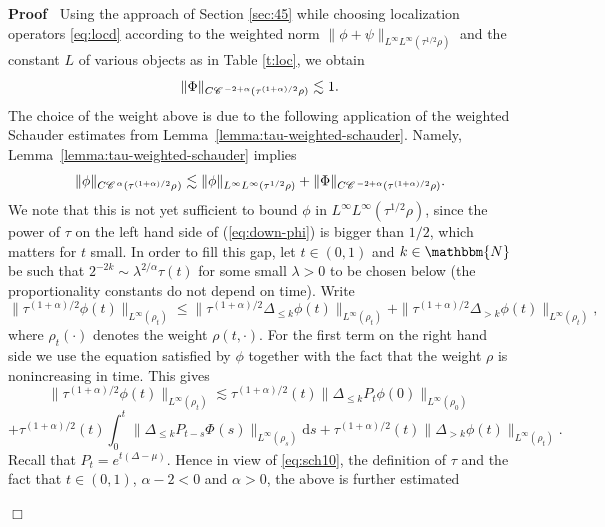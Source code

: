 \documentclass[a4paper,11pt]{article}
\newcommand{\mathd}{\mathrm{d}}
\newenvironment{proof}{\noindent\textbf{Proof\ }}{\hspace*{\fill}$\Box$\medskip}
\numberwithin{equation}{section}
\newcommand{\CC}{\mathscr{C} \hspace{.1em}}
\newcommand{\8}{\infty}
\begin{document}
\begin{proof}
  Using the approach of Section \ref{sec:45} while choosing localization
  operators \eqref{eq:locd} according to the weighted norm $\| \phi + \psi \|_{L^{\infty}
  L^{\infty} (\tau^{1 / 2} \rho)}$ and the constant $L$ of various objects as in Table \ref{t:loc}, we obtain
     \begin{equation}\label{eq:Ph}
 \| \Phi \|_{C \CC^{- 2 + \alpha} (\tau^{(1 + \alpha) / 2} \rho)} \lesssim
     1.
     \end{equation}
The choice of the weight above is due to the following application of the weighted Schauder estimates from Lemma~\ref{lemma:tau-weighted-schauder}.   Namely, Lemma~\ref{lemma:tau-weighted-schauder} implies
  \begin{equation}
    \| \phi \|_{C \CC^{\alpha} (\tau^{(1 + \alpha) / 2} \rho^{})} \lesssim \|
    \phi \|_{L^{\infty} L^{\infty} (\tau^{1 / 2} \rho)} + \| \Phi \|_{C \CC^{-
    2 + \alpha} (\tau^{(1 + \alpha) / 2} \rho)} . \label{eq:down-phi}
  \end{equation}
  We note that this is not yet sufficient to bound $\phi$ in $L^{\infty}
  L^{\infty} (\tau^{1 / 2} \rho)$, since the power of $\tau$ on the left hand side of
  (\ref{eq:down-phi}) is bigger than $1 / 2$, which matters for $t$ small. In order to fill this gap, let $t\in (0,1)$ and
  $k \in \mathbbm{N}$ be such that $2^{- 2 k} \sim \lambda^{2 / \alpha} \tau (t)$
  for some small $\lambda > 0$ to be chosen below (the proportionality constants do not depend on time). Write
  \[ \| \tau^{(1 + \alpha) / 2} \phi (t) \|_{L^{\infty} (\rho_t)} \leqslant \|
     \tau^{(1 + \alpha) / 2} \Delta_{\leqslant k} \phi (t) \|_{L^{\infty}
     (\rho_t)} + \| \tau^{(1 + \alpha) / 2} \Delta_{> k} \phi (t)
     \|_{L^{\infty} (\rho_t)}, \]
  where $\rho_t (\cdot)$ denotes the weight $\rho (t, \cdot)$. For the first
  term on the right hand side we use the equation satisfied by $\phi$ together
  with the fact that the weight $\rho$ is nonincreasing in time. This gives
  \[ \| \tau^{(1 + \alpha) / 2} \phi (t) \|_{L^{\infty} (\rho_t)} \lesssim
     \tau^{(1 + \alpha) / 2} (t) \| \Delta_{\leqslant k} P_t \phi (0)
     \|_{L^{\infty} (\rho_0)} \]
  \[ + \tau^{(1 + \alpha) / 2} (t) \int_0^t  \|
     \Delta_{\leqslant k} P_{t - s} \Phi_{} (s) \|_{L^{\infty} (\rho_s)}
     \mathd s + \tau^{(1 + \alpha) / 2} (t) \| \Delta_{> k} \phi (t)
     \|_{L^{\infty} (\rho_t)} . \]
Recall  that $P_{t}=e^{t(\Delta-\mu)}$. Hence in view of \eqref{eq:sch10}, the definition of $\tau$ and the fact that $t\in(0,1)$, $\alpha - 2 < 0$ and $\alpha > 0$,  the above is further estimated

\end{proof}
\end{document}
